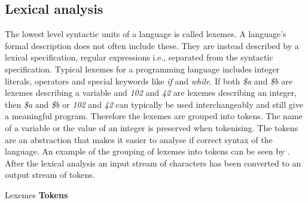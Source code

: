 \subsection{Lexical analysis}
\label{sec:lexicalanalysis}
The lowest level syntactic units of a language is called lexemes. A language's formal description does not often include these. They are instead described by a lexical specification, regular expressions i.e., separated from the syntactic specification\cite[p. 135]{sebesta2013}. Typical lexemes for a programming language includes integer literals, operators and special keywords like \textit{if} and \textit{while}. If both \textit{\$a} and \textit{\$b} are lexemes describing a variable and \textit{102} and \textit{42} are lexemes describing an integer, then \textit{\$a} and \textit{\$b} or \textit{102} and \textit{42} can typically be used interchangeably and still give a meaningful program. Therefore the lexemes are grouped into tokens. The name of a variable or the value of an integer is preserved when tokenising. The tokens are an abstraction that makes it easier to analyse if correct syntax of the language. An example of the grouping of lexemes into tokens can be seen by . After the lexical analysis an input stream of characters has been converted to an output stream of tokens.

		    {               }
{Lexemes   }{\textbf{Tokens}}{
}